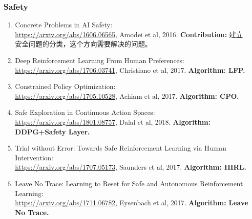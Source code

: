 \documentclass[lang=cn,11pt,a4paper]{eleganttemplate}
\begin{document}
\subsubsection{Safety}
\begin{enumerate}
    \item Concrete Problems in AI Safety:\\ \href{https://arxiv.org/abs/1606.06565}{https://arxiv.org/abs/1606.06565}, Amodei et al, 2016. \textbf{Contribution:} 建立安全问题的分类，这个方向需要解决的问题。
    \item Deep Reinforcement Learning From Human Preferences:\\ \href{https://arxiv.org/abs/1706.03741}{https://arxiv.org/abs/1706.03741}, Christiano et al, 2017. \textbf{Algorithm: LFP.}
    \item Constrained Policy Optimization:\\ \href{https://arxiv.org/abs/1705.10528}{https://arxiv.org/abs/1705.10528}, Achiam et al, 2017. \textbf{Algorithm: CPO.}
    \item Safe Exploration in Continuous Action Spaces:\\ \href{https://arxiv.org/abs/1801.08757}{https://arxiv.org/abs/1801.08757}, Dalal et al, 2018. \textbf{Algorithm: DDPG+Safety Layer.}
    \item Trial without Error: Towards Safe Reinforcement Learning via Human Intervention:\\ \href{https://arxiv.org/abs/1707.05173}{https://arxiv.org/abs/1707.05173}, Saunders et al, 2017. \textbf{Algorithm: HIRL.}
    \item Leave No Trace: Learning to Reset for Safe and Autonomous Reinforcement Learning:\\ \href{https://arxiv.org/abs/1711.06782}{https://arxiv.org/abs/1711.06782}, Eysenbach et al, 2017. \textbf{Algorithm: Leave No Trace.}
\end{enumerate}
\end{document}
